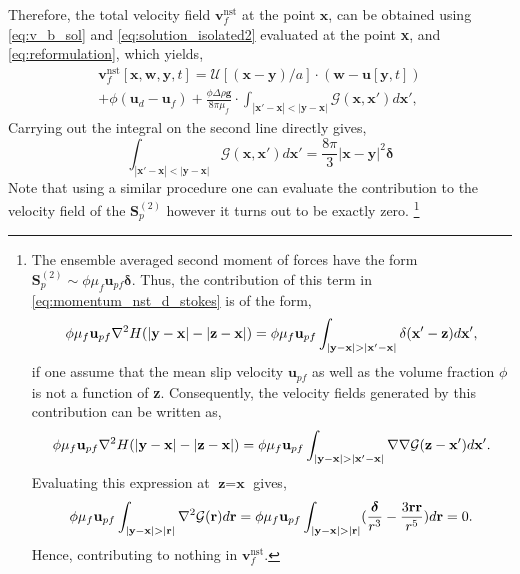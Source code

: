 Therefore, the total velocity field $\textbf{v}^\text{nst}_f$ at the point $\textbf{x}$, can be obtained using \ref{eq:v_b_sol} and \ref{eq:solution_isolated2} evaluated at the point \textbf{x}, and  \ref{eq:reformulation}, which yields,  
\begin{multline}
    \textbf{v}^\text{nst}_f [\textbf{x},\textbf{w},\textbf{y},t]
    =
    \mathcal{U}[(\textbf{x} - \textbf{y})/a]\cdot 
    (\textbf{w}- \textbf{u}[\textbf{y},t])
    \\
    +
    \phi(\textbf{u}_d - \textbf{u}_f)
    + 
    \frac{\phi\Delta \rho \textbf{g}}{8\pi \mu_f}\cdot 
    \int_{|\textbf{x}'-\textbf{x}|< |\textbf{y}- \textbf{x}|}
    \mathcal{G}(\textbf{x},\textbf{x}')
    d\textbf{x}',
\end{multline}
Carrying out the integral on the second line directly gives,
\begin{equation}
    \int_{|\textbf{x}'-\textbf{x}|< |\textbf{y}- \textbf{x}|}
    \mathcal{G}(\textbf{x},\textbf{x}')
    d\textbf{x}'
    = \frac{8\pi}{3}|\textbf{x}- \textbf{y}|^2\bm\delta
\end{equation}
Note that using a similar procedure one can evaluate the contribution to the velocity field of the $\textbf{S}_p^{(2)}$ however it turns out to be exactly zero.
\footnote{
    The ensemble averaged second moment of forces have the form $\textbf{S}_p^{(2)} \sim \phi \mu_f \textbf{u}_{pf} \bm\delta$. 
    Thus, the contribution of this term in \ref{eq:momentum_nst_d_stokes} is of the form, 
    \begin{equation*}
        \phi \mu_f \textbf{u}_{pf} \mathbf{\nabla}^2  H(|\textbf{y}- \textbf{x}| - |\textbf{z} -\textbf{x}|)
        =  \phi \mu_f \textbf{u}_{pf} \int_{|\textbf{y} - \textbf{x}| > |\textbf{x}' - \textbf{x}|}
        \delta(\textbf{x}'-\textbf{z})
        d\textbf{x}',
    \end{equation*}
    if one assume that the mean slip velocity $\textbf{u}_{pf}$ as well as the volume fraction $\phi$ is not a function of \textbf{z}. 
    Consequently, the velocity fields generated by this contribution can be written as, 
    \begin{equation*}
        \phi \mu_f \textbf{u}_{pf} \mathbf{\nabla}^2  H(|\textbf{y}- \textbf{x}| - |\textbf{z} -\textbf{x}|)
        =  \phi \mu_f \textbf{u}_{pf} \int_{|\textbf{y} - \textbf{x}| > |\textbf{x}' - \textbf{x}|}
        \mathbf{\nabla}\mathbf{\nabla}\mathcal{G}(\textbf{z} - \textbf{x}')
        d\textbf{x}'. 
    \end{equation*}     
    Evaluating this expression at $\textbf{z} = \textbf{x}$ gives, 
    \begin{equation*}
        \phi \mu_f \textbf{u}_{pf} \int_{|\textbf{y} - \textbf{x}| > |\textbf{r}|}
        \mathbf{\nabla}^2\mathcal{G}(\textbf{r})
        d\textbf{r} 
        = 
        \phi \mu_f \textbf{u}_{pf} \int_{|\textbf{y} - \textbf{x}| > |\textbf{r}|}
        (\frac{\bm\delta}{r^3} - \frac{3\textbf{rr}}{r^5})
        d\textbf{r} 
        = 0. 
    \end{equation*}     
    Hence, contributing to nothing in $\textbf{v}_f^\text{nst}$.
} 
